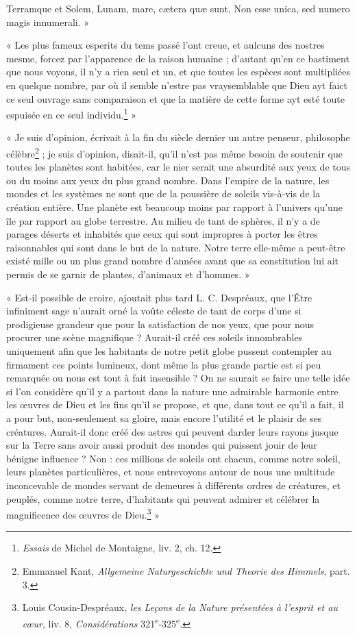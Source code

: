 \documentclass[a4paper, 11pt, oneside, landscape]{article}
\begin{document}
Terramque et Solem, Lunam, mare, cætera quæ sunt,  
Non esse unica, sed numero magis innumerali. »

« Les plus fameux esperits du tems passé l'ont creue, et aulcuns des nostres mesme, forcez par l'apparence de la raison humaine ; d'autant qu'en ce bastiment que nous voyons, il n'y a rien seul et un, et que toutes les espèces sont multipliées en quelque nombre, par où il semble n'estre pas vraysemblable que Dieu ayt faict ce seul ouvrage sans comparaison et que la matière de cette forme ayt esté toute espuisée en ce seul individu.\footnote{\emph{Essais} de Michel de Montaigne, liv. 2, ch. 12.} »

« Je suis d'opinion, écrivait à la fin du siècle dernier un autre penseur, philosophe célèbre\footnote{Emmanuel Kant, \emph{Allgemeine Naturgeschichte und Theorie des Himmels}, part. 3.} ; je suis d'opinion, disait-il, qu'il n'est pas même besoin de soutenir que toutes les planètes sont habitées, car le nier serait une absurdité aux yeux de tous ou du moins aux yeux du plus grand nombre. Dans l'empire de la nature, les mondes et les systèmes ne sont que de la poussière de soleils vis-à-vis de la création entière. Une planète est beaucoup moins par rapport à l'univers qu'une île par rapport au globe terrestre. Au milieu de tant de sphères, il n'y a de parages déserts et inhabités que ceux qui sont impropres à porter les êtres raisonnables qui sont dans le but de la nature. Notre terre elle-même a peut-être existé mille ou un plus grand nombre d'années avant que sa constitution lui ait permis de se garnir de plantes, d'animaux et d'hommes. »

« Est-il possible de croire, ajoutait plus tard L. C. Despréaux, que l'Être infiniment sage n'aurait orné la voûte céleste de tant de corps d'une si prodigieuse grandeur que pour la satisfaction de nos yeux, que pour nous procurer une scène magnifique ? Aurait-il créé ces soleils innombrables uniquement afin que les habitants de notre petit globe pussent contempler au firmament ces points lumineux, dont même la plus grande partie est si peu remarquée ou nous est tout à fait insensible ? On ne saurait se faire une telle idée si l'on considère qu'il y a partout dans la nature une admirable harmonie entre les œuvres de Dieu et les fins qu'il se propose, et que, dans tout ce qu'il a fait, il a pour but, non-seulement sa gloire, mais encore l'utilité et le plaisir de ses créatures. Aurait-il donc créé des astres qui peuvent darder leurs rayons jusque sur la Terre sans avoir aussi produit des mondes qui puissent jouir de leur bénigne influence ? Non : ces millions de soleils ont chacun, comme notre soleil, leurs planètes particulières, et nous entrevoyons autour de nous une multitude inconcevable de mondes servant de demeures à différents ordres de créatures, et peuplés, comme notre terre, d'habitants qui peuvent admirer et célébrer la magnificence des œuvres de Dieu.\footnote{Louis Cousin-Despréaux, \emph{les Leçons de la Nature présentées à l'esprit et au cœur}, liv. 8, \emph{Considérations} 321\textsuperscript{e}-325\textsuperscript{e}.} »
\end{document}
